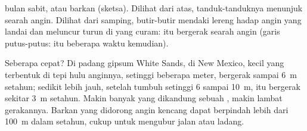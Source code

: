 \begin{omfigure}

{\small {} bulan sabit, atau barkan (sketsa). Dilihat dari atas,
tanduk-tanduknya menunjuk searah angin. Dilihat dari samping, butir-butir
 mendaki lereng hadap angin yang landai dan meluncur turun di  yang curam:  itu bergerak searah angin (garis putus-putus:
 itu beberapa waktu kemudian).}
\label{fig:g9:landforms:barchan}
\end{omfigure}

Seberapa cepat? Di padang  gipsum White Sands, di New Mexico,
 kecil yang terbentuk di tepi hulu anginnya, setinggi beberapa
meter, bergerak sampai \qty{6}{m} setahun; sedikit lebih jauh, setelah
tumbuh setinggi 6 sampai \qty{10}{m},  itu bergerak sekitar
\qty{3}{m} setahun. Makin banyak  yang dikandung sebuah , makin
lambat gerakannya. Barkan yang didorong angin kencang dapat berpindah lebih
dari \qty{100}{m} dalam setahun, cukup untuk mengubur jalan atau ladang.


